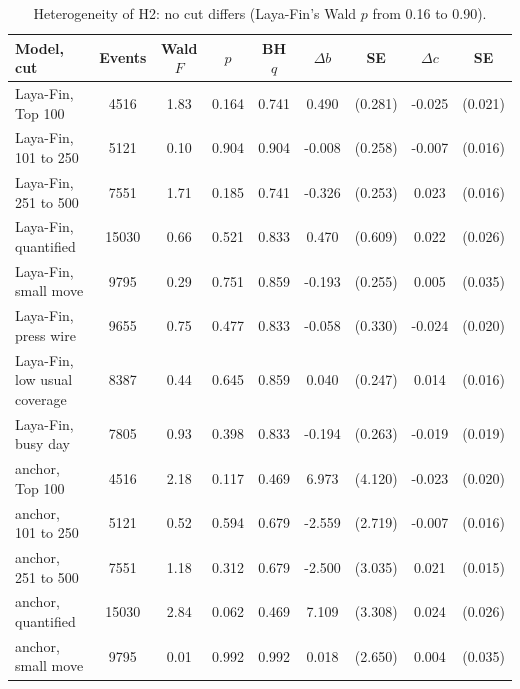 \begin{table}[htbp]
\centering
\small
\begin{threeparttable}
\caption{Heterogeneity of H2: no cut differs (Laya-Fin's Wald $p$ from 0.16 to 0.90).}\label{tab:a-heterogeneity}
\begin{tabular}{@{}lS[table-format=5.0]S[table-format=1.2]S[table-format=1.3]S[table-format=1.3]S[table-format=-1.3]S[table-format=1.3, table-space-text-pre=(, table-space-text-post=)]S[table-format=-1.3]S[table-format=1.3, table-space-text-pre=(, table-space-text-post=)]@{}}
\toprule
Model, cut & {Events} & {Wald $F$} & {$p$} & {BH $q$} & {$\Delta b$} & {SE} & {$\Delta c$} & {SE} \\
\midrule
Laya-Fin, Top 100 & 4516 & 1.83 & 0.164 & 0.741 & 0.490 & {(}0.281{)} & -0.025 & {(}0.021{)} \\
Laya-Fin, 101 to 250 & 5121 & 0.10 & 0.904 & 0.904 & -0.008 & {(}0.258{)} & -0.007 & {(}0.016{)} \\
Laya-Fin, 251 to 500 & 7551 & 1.71 & 0.185 & 0.741 & -0.326 & {(}0.253{)} & 0.023 & {(}0.016{)} \\
Laya-Fin, quantified & 15030 & 0.66 & 0.521 & 0.833 & 0.470 & {(}0.609{)} & 0.022 & {(}0.026{)} \\
Laya-Fin, small move & 9795 & 0.29 & 0.751 & 0.859 & -0.193 & {(}0.255{)} & 0.005 & {(}0.035{)} \\
Laya-Fin, press wire & 9655 & 0.75 & 0.477 & 0.833 & -0.058 & {(}0.330{)} & -0.024 & {(}0.020{)} \\
Laya-Fin, low usual coverage & 8387 & 0.44 & 0.645 & 0.859 & 0.040 & {(}0.247{)} & 0.014 & {(}0.016{)} \\
Laya-Fin, busy day & 7805 & 0.93 & 0.398 & 0.833 & -0.194 & {(}0.263{)} & -0.019 & {(}0.019{)} \\
anchor, Top 100 & 4516 & 2.18 & 0.117 & 0.469 & 6.973 & {(}4.120{)} & -0.023 & {(}0.020{)} \\
anchor, 101 to 250 & 5121 & 0.52 & 0.594 & 0.679 & -2.559 & {(}2.719{)} & -0.007 & {(}0.016{)} \\
anchor, 251 to 500 & 7551 & 1.18 & 0.312 & 0.679 & -2.500 & {(}3.035{)} & 0.021 & {(}0.015{)} \\
anchor, quantified & 15030 & 2.84 & 0.062 & 0.469 & 7.109 & {(}3.308{)} & 0.024 & {(}0.026{)} \\
anchor, small move & 9795 & 0.01 & 0.992 & 0.992 & 0.018 & {(}2.650{)} & 0.004 & {(}0.035{)} \\

\end{tabular}
\end{threeparttable}
\end{table}
